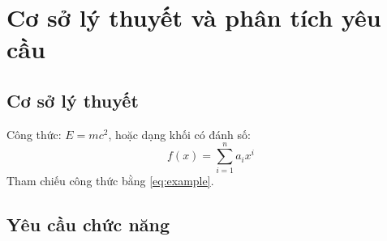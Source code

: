 \section{Cơ sở lý thuyết và phân tích yêu cầu}
\subsection{Cơ sở lý thuyết}
Công thức: $E = mc^2$, hoặc dạng khối có đánh số:
\begin{equation}
  \label{eq:example}
  f(x) = \sum_{i=1}^{n} a_i x^i
\end{equation}
Tham chiếu công thức bằng \eqref{eq:example}.

\subsection{Yêu cầu chức năng}

